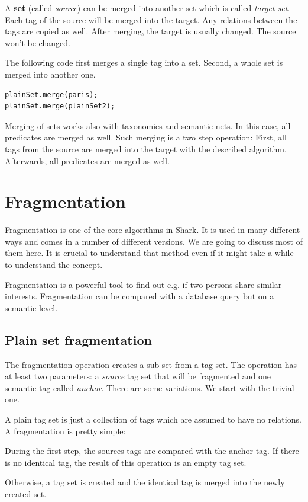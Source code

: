 A {\bf set} (called {\it source}) can be merged into another set which is called {\it target set}. Each tag of the source will be merged into the target. Any relations between the tags are copied as well. After merging, the target is usually changed. The source won't be changed.

The following code first merges a single tag into a set. Second, a whole set is merged into another one.

\begin{verbatim}
plainSet.merge(paris);
plainSet.merge(plainSet2);
\end{verbatim}

Merging of sets works also with taxonomies and semantic nets. In this case, all predicates are merged as well. Such merging is a two step operation: First, all tags from the source are merged into the target with the described algorithm. Afterwards, all predicates are merged as well. 

\section{Fragmentation}
Fragmentation is one of the core algorithms in Shark. It is used in many different ways and comes in a number of different versions. We are going to discuss most of them here. It is crucial to understand that method even if it might take a while to understand the concept.

Fragmentation is a powerful tool to find out e.g. if two persons share similar interests. Fragmentation can be compared with a database query but on a semantic level.

\subsection{Plain set fragmentation}
The fragmentation operation creates a sub set from a tag set. The operation has at least two parameters: a {\it source} tag set that will be fragmented and one semantic tag called {\it anchor}. There are some variations. We start with the trivial one.

A plain tag set is just a collection of tags which are assumed to have no relations. A fragmentation is pretty simple:

During the first step, the sources tags are compared with the anchor tag. If there is no identical tag, the result of this operation is an empty tag set.

Otherwise, a tag set is created and the identical tag is merged into the newly created set.

